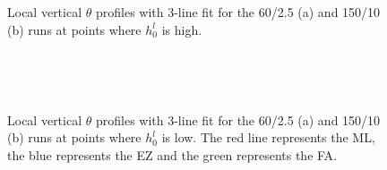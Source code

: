 \begin{figure}[htbp]
\begin{minipage}[b]{0.5\linewidth}
        \\
        \end{minipage}             
\quad
\begin{minipage}[b]{0.5\linewidth}
        \\
       
       \end{minipage}
\caption[High local \acs{ML}]{Local vertical $\theta$ profiles with 3-line fit for the 60/2.5 (a) and 150/10 (b) runs at 
points where $h^{l}_{0}$ is high.}
        
        \label{fig:rssfitshigh}
\end{figure}

\begin{figure}[htbp]
        
\begin{minipage}[b]{0.5\linewidth}
        \\

        \end{minipage}             
\quad
\begin{minipage}[b]{0.5\linewidth}
        \\
       
       \end{minipage}
\caption[Low local \acs{ML}]{Local vertical $\theta$ profiles with 3-line fit for the 60/2.5 (a) and 150/10 (b) runs at 
points where $h^{l}_{0}$ is low. The red line represents the \acs{ML}, the blue represents the \acs{EZ} and the green represents the \acs{FA}.}
        \label{fig:rssfitslow}
\end{figure}


